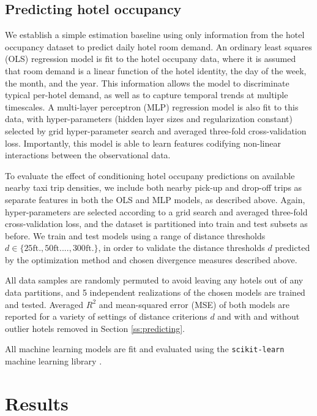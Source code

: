 \documentclass[useAMS, usenatbib]{biom}
\begin{document}
\subsection{Predicting hotel occupancy}

We establish a simple estimation baseline using only information from the hotel occupancy dataset to predict daily hotel room demand. An ordinary least squares (OLS) regression model is fit to the hotel occupany data, where it is assumed that room demand is a linear function of the hotel identity, the day of the week, the month, and the year. This information allows the model to discriminate typical per-hotel demand, as well as to capture temporal trends at multiple timescales. A multi-layer perceptron (MLP) regression model is also fit to this data, with hyper-parameters (hidden layer sizes and regularization constant) selected by grid hyper-parameter search and averaged three-fold cross-validation loss. Importantly, this model is able to learn features codifying non-linear interactions between the observational data.

To evaluate the effect of conditioning hotel occupany predictions on available nearby taxi trip densities, we include both nearby pick-up and drop-off trips as separate features in both the OLS and MLP models, as described above. Again, hyper-parameters are selected according to a grid search and averaged three-fold cross-validation loss, and the dataset is partitioned into train and test subsets as before. We train and test models using a range of distance thresholds $d \in \{25 \mathrm{ft.}, 50 \mathrm{ft.} ..., 300 \mathrm{ft.} \}$, in order to validate the distance thresholds $d$ predicted by the optimization method and chosen divergence measures described above.

All data samples are randomly permuted to avoid leaving any hotels out of any data partitions, and 5 independent realizations of the chosen models are trained and tested. Averaged $R^2$ and mean-squared error (MSE) of both models are reported for a variety of settings of distance criterions $d$ and with and without outlier hotels removed in Section \ref{ss:predicting}.

All machine learning models are fit and evaluated using the \texttt{scikit-learn} machine learning library \citep{scikit-learn}.

\section{Results}
\label{s:results}
\end{document}
